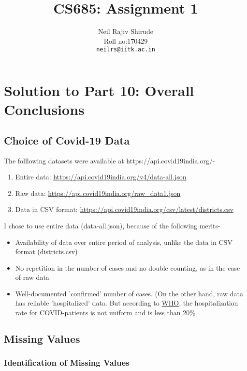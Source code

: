 \documentclass{article}
\title{CS685: Assignment 1}
\author{
  Neil Rajiv Shirude \\
  Roll no:170429 \\
  \texttt{neilrs@iitk.ac.in} \\
 }
\begin{document}
\maketitle

\section{Solution to Part 10: Overall Conclusions}

\subsection{Choice of Covid-19 Data}

The folllowing datasets were available at https://api.covid19india.org/-
\begin{enumerate}
    \item Entire data: \url{https://api.covid19india.org/v4/data-all.json}
    \item Raw data: \url{https://api.covid19india.org/raw_data1.json}
    \item Data in CSV format: \url{https://api.covid19india.org/csv/latest/districts.csv} 
\end{enumerate}

I chose to use entire data (data-all.json), because of the following merits- 
\begin{itemize}
    \item Availability of data over entire period of analysis, unlike the data in CSV format (districts.csv)
    \item No repetition in the number of cases and no double counting, as in the case of raw data
    \item Well-documented 'confirmed' number of cases. (On the other hand, raw data has reliable 'hospitalized' data. But according to \href{https://www.who.int/indonesia/news/detail/08-03-2020-knowing-the-risk-for-covid-19#:~:text=Most\%20people\%20(about\%2080,are\%20at\%20greater\%20risk.}{WHO}, the hospitalization rate for COVID-patients is not uniform and is less than 20\%.
\end{itemize}

\subsection{Missing Values}

\subsubsection{Identification of Missing Values}
\end{document}
